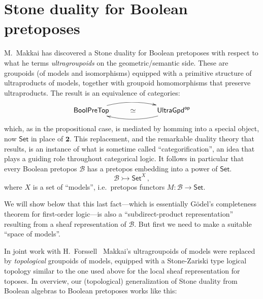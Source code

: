 \documentclass[graybox]{svmult}
\newcommand{\Set}{\ensuremath{\mathsf{Set}}}
\newcommand{\mono}{\ensuremath{\rightarrowtail}}
\begin{document}
\section{Stone duality for Boolean pretoposes}

M.~Makkai \cite{M} has discovered a Stone duality for Boolean pretoposes with respect to what he terms \emph{ultragroupoids} on the geometric/semantic side. These are groupoids (of models and isomorphisms) equipped with a primitive structure of ultraproducts of models, together with groupoid homomorphisms that preserve ultraproducts.  The result is an equivalence of categories:

\[
\xymatrix{ 
\mathsf{BoolPreTop}  \ar@/{}^{1pc}/[rr]     & \simeq &  \mathsf{UltraGpd}^{\mathsf{op}}  \ar@/{}^{1pc}/[ll] \\
} 
\]
\smallskip

\noindent which, as in the propositional case, is mediated by homming into a special object, now $\Set$ in place of $\mathbf{2}$.  This replacement, and the remarkable duality theory that results, is an instance of what is sometime called ``categorification'', an idea that plays a guiding role throughout categorical logic.  It follows in particular that every Boolean pretopos $\mathcal{B}$ has a pretopos embedding into a power of $\Set$.
\[
\mathcal{B} \mono \Set^X\,,
\]
where $X$ is a set of ``models'', i.e.\ pretopos functors $M : \mathcal{B}\to \Set$.  

We will show below that this last fact---which is essentially G\"odel's completeness theorem for first-order logic---is also a ``subdirect-product representation'' resulting from a sheaf representation of $\mathcal{B}$.  But first we need to make a suitable ``space of models''.

In joint work with H.~Forssell~\cite{AF,For} Makkai's ultragroupoids of models were replaced by \emph{topological} groupoids of models, equipped with a Stone-Zariski type logical topology similar to the one used above for the local sheaf representation for toposes. In overview, our (topological) generalization of Stone duality from Boolean algebras to Boolean pretoposes works like this:
\medskip
\end{document}
